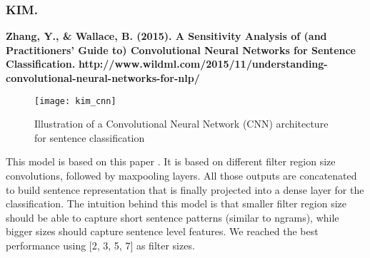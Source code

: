\subsubsection{KIM.}

\textbf{Zhang, Y., \& Wallace, B. (2015). A Sensitivity Analysis of (and Practitioners’ Guide to) Convolutional Neural Networks for Sentence Classification.}
\textbf{http://www.wildml.com/2015/11/understanding-convolutional-neural-networks-for-nlp/}

\begin{figure}[h]
\centering
\texttt{[image: kim\_cnn]}
\caption{Illustration of a Convolutional Neural Network (CNN) architecture for sentence classification}
\label{fig:kim}
\end{figure}

This model is based on this paper \cite{kim2014convolutional}. It is based on different filter region size convolutions, followed by maxpooling layers.
All those outputs are concatenated to build sentence representation that is finally projected into a dense layer for the classification.
The intuition behind this model is that smaller filter region size should be able to capture short sentence patterns (similar to ngrams), while bigger sizes should capture sentence level features. We reached the best performance using [2, 3, 5, 7] as filter sizes.
